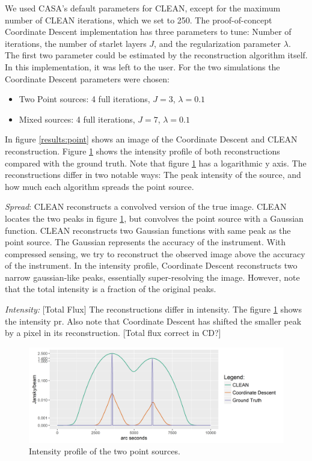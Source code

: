 We used CASA's default parameters for CLEAN, except for the maximum number of CLEAN iterations, which we set to 250. The proof-of-concept Coordinate Descent implementation has three parameters to tune: Number of iterations, the number of starlet layers $J$, and the regularization parameter $\lambda$. The first two parameter could be estimated by the reconstruction algorithm itself. In this implementation, it was left to the user. For the two simulations the Coordinate Descent parameters were chosen:
\begin{itemize}
	\item Two Point sources: 4 full iterations, $J=3$, $\lambda=0.1$
	\item Mixed sources: 4 full iterations, $J=7$, $\lambda=0.1$
\end{itemize}

In figure \ref{results:point} shows an image of the Coordinate Descent and CLEAN reconstruction. Figure \ref{results:points:contour} shows the intensity profile of both reconstructions compared with the ground truth. Note that figure \ref{results:points:contour} has a logarithmic y axis. The reconstructions differ in two notable ways: The peak intensity of the source, and how much each algorithm spreads the point source. 

\textit{Spread}: CLEAN reconstructs a convolved version of the true image. CLEAN locates the two peaks in figure \ref{results:points:contour}, but convolves the point source with a Gaussian function. CLEAN reconstructs two Gaussian functions with same peak as the point source. The Gaussian represents the accuracy of the instrument. With compressed sensing, we try to reconstruct the observed image above the accuracy of the instrument. In the intensity profile, Coordinate Descent reconstructs two narrow gaussian-like peaks, essentially super-resolving the image. However, note that the total intensity is a fraction of the original peaks.

\textit{Intensity:} [Total Flux] The reconstructions differ in intensity. The figure \ref{results:points:contour} shows the intensity pr. Also note that Coordinate Descent has shifted the smaller peak by a pixel in its reconstruction. [Total flux correct in CD?]

\begin{figure}[h]
	\centering
	\includegraphics[width=0.8\linewidth]{./chapters/20.results/points/contour_points.png}
	\caption{Intensity profile of the two point sources.}
	\label{results:points:contour}
\end{figure}

